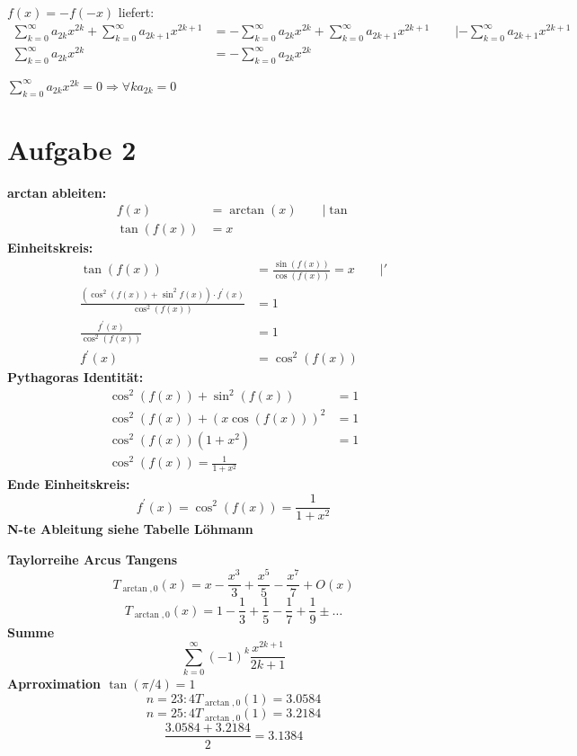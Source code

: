 \documentclass[a4paper, ngerman]{scrartcl}
\begin{document}
	$f(x) = -f(-x)$ liefert:
	\begin{align*}
		\sum_{k=0}^{\infty} a_{2k}x^{2k} + \sum_{k=0}^{\infty} a_{2k + 1}x^{2k + 1} &= -\sum_{k=0}^{\infty} a_{2k}x^{2k} + \sum_{k=0}^{\infty} a_{2k + 1}x^{2k + 1} \qquad |-\sum_{k=0}^{\infty} a_{2k+1}x^{2k+1} \\
		\sum_{k=0}^{\infty} a_{2k}x^{2k} &= - \sum_{k=0}^{\infty} a_{2k}x^{2k}
	\end{align*}
	
	$\displaystyle{\sum_{k=0}^{\infty} a_{2k}x^{2k} = 0} \Rightarrow \forall k a_{2k} = 0$ 
	
	\section*{Aufgabe 2}
	\textbf{arctan ableiten:}
	\begin{align*}
		f(x) &= \arctan(x) \qquad |\tan\\
		\tan(f(x)) &= x
	\end{align*}
	\textbf{Einheitskreis:}
	\begin{align*}
		\tan(f(x)) &= \frac{\sin(f(x))}{\cos(f(x))} = x \qquad | \prime\\
		\frac{(\cos^2(f(x)) + \sin^2f(x))\cdot f^\prime(x)}{\cos^2(f(x))} &= 1\\
		\frac{f^\prime(x)}{\cos^2(f(x))} &= 1\\
		f^\prime(x) &= \cos^2(f(x))
	\end{align*}
	\textbf{Pythagoras Identität:}
	\begin{align*}
		\cos^2(f(x)) + \sin^2(f(x)) &= 1\\
		\cos^2(f(x)) + (x\cos(f(x)))^2 &= 1\\
		\cos^2(f(x))(1+x^2) &= 1\\
		\cos^2(f(x)) = \frac{1}{1 + x^2}
	\end{align*}
	\textbf{Ende Einheitskreis:}
	$$f^\prime(x) = \cos^2(f(x)) = \frac{1}{1 + x^2}$$
	\textbf{N-te Ableitung siehe Tabelle Löhmann}	
	
	\noindent
	\textbf{Taylorreihe Arcus Tangens}
	$$T_{\arctan, 0}(x) = x - \frac{x^3}{3} + \frac{x^5}{5} - \frac{x^7}{7} + O(x)$$
	$$T_{\arctan, 0}(x) = 1 - \frac{1}{3} + \frac{1}{5} - \frac{1}{7} + \frac{1}{9} \pm \dots$$
	\textbf{Summe}
	$$\sum_{k=0}^{\infty}(-1)^{k}\frac{x^{2k+1}}{2k + 1}$$
	\textbf{Aprroximation $\tan(\pi/4) = 1$}
	$$n = 23: 4T_{\arctan, 0}(1) = 3.0584$$
	$$n = 25: 4T_{\arctan, 0}(1) = 3.2184$$
	$$\frac{3.0584 + 3.2184}{2} = 3.1384$$
	
\end{document}
